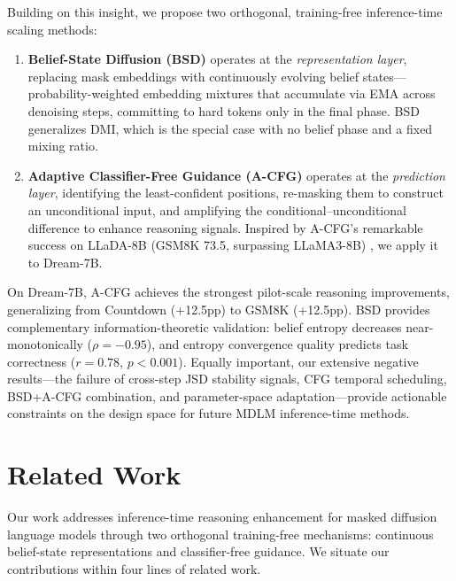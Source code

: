 \documentclass{article}
\begin{document}
Building on this insight, we propose two orthogonal, training-free inference-time scaling methods:

\begin{enumerate}
\item \textbf{Belief-State Diffusion (BSD)} operates at the \emph{representation layer}, replacing mask embeddings with continuously evolving belief states---probability-weighted embedding mixtures that accumulate via EMA across denoising steps, committing to hard tokens only in the final phase. BSD generalizes DMI, which is the special case with no belief phase and a fixed mixing ratio.

\item \textbf{Adaptive Classifier-Free Guidance (A-CFG)} operates at the \emph{prediction layer}, identifying the least-confident positions, re-masking them to construct an unconditional input, and amplifying the conditional--unconditional difference to enhance reasoning signals. Inspired by A-CFG's remarkable success on LLaDA-8B (GSM8K 73.5, surpassing LLaMA3-8B) \citep{arriola2025acfg}, we apply it to Dream-7B.
\end{enumerate}

On Dream-7B, A-CFG achieves the strongest pilot-scale reasoning improvements, generalizing from Countdown (+12.5pp) to GSM8K (+12.5pp). BSD provides complementary information-theoretic validation: belief entropy decreases near-monotonically ($\rho = -0.95$), and entropy convergence quality predicts task correctness ($r = 0.78$, $p < 0.001$). Equally important, our extensive negative results---the failure of cross-step JSD stability signals, CFG temporal scheduling, BSD+A-CFG combination, and parameter-space adaptation---provide actionable constraints on the design space for future MDLM inference-time methods.


\section{Related Work}
\label{sec:related}

Our work addresses inference-time reasoning enhancement for masked diffusion language models through two orthogonal training-free mechanisms: continuous belief-state representations and classifier-free guidance. We situate our contributions within four lines of related work.
\end{document}
